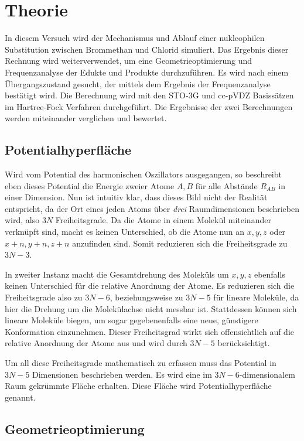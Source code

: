 \section{Theorie}

In diesem Versuch wird der Mechanismus und Ablauf einer nukleophilen Substitution zwischen Brommethan und Chlorid simuliert.
Das Ergebnis dieser Rechnung wird weiterverwendet, um eine Geometrieoptimierung und Frequenzanalyse der Edukte und Produkte durchzuführen.
Es wird nach einem Übergangszustand gesucht, der mittels dem Ergebnis der Frequenzanalyse bestätigt wird.
Die Berechnung wird mit den STO-3G und cc-pVDZ Basissätzen im Hartree-Fock Verfahren durchgeführt.
Die Ergebnisse der zwei Berechnungen werden miteinander verglichen und bewertet.

\subsection{Potentialhyperfläche}

Wird vom Potential des harmonischen Oszillators ausgegangen, so beschreibt eben dieses Potential die Energie zweier Atome $A, B$ für alle Abstände $R_{AB}$ in einer Dimension.
Nun ist intuitiv klar, dass dieses Bild nicht der Realität entspricht, da der Ort eines jeden Atoms über \textit{drei} Raumdimensionen beschrieben wird, also $3N$ Freiheitsgrade.
Da die Atome in einem Molekül miteinander verknüpft sind, macht es keinen Unterschied, ob die Atome nun an $x, y, z$ oder $x + n, y + n, z + n$ anzufinden sind.
Somit reduzieren sich die Freiheitsgrade zu $3N - 3$.

In zweiter Instanz macht die Gesamtdrehung des Moleküls um $x, y, z$ ebenfalls keinen Unterschied für die relative Anordnung der Atome.
Es reduzieren sich die Freiheitsgrade also zu $3N - 6$,  beziehungsweise zu $3N - 5$ für lineare Moleküle, da hier die Drehung um die Molekülachse nicht messbar ist.
Stattdessen können sich lineare Moleküle biegen, um sogar gegebenenfalls eine neue, günstigere Konformation einzunehmen.
Dieser Freiheitsgrad wirkt sich offensichtlich auf die relative Anordnung der Atome aus und wird durch $3N - 5$ berücksichtigt.

Um all diese Freiheitsgrade mathematisch zu erfassen muss das Potential in $3N - 5$ Dimensionen beschrieben werden.
Es wird eine im $3N - 6$-dimensionalem Raum gekrümmte Fläche erhalten.
Diese Fläche wird Potentialhyperfläche genannt.

\subsection{Geometrieoptimierung}

